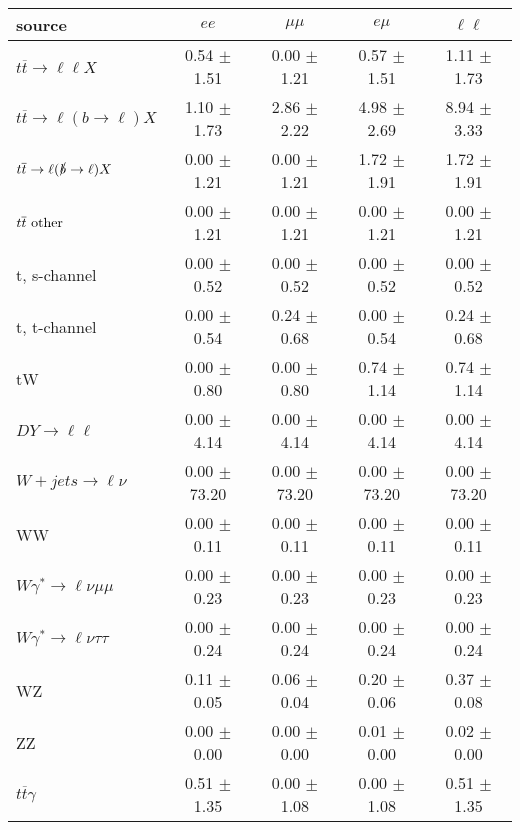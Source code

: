 \begin{tabular}{l|cccc} \hline\hline
source & $ee$ & $\mu\mu$ & $e\mu$ & $\ell\ell $ \\
\hline
$t\overline{t} \rightarrow \ell \ell X$ &  0.54 $\pm$  1.51 &  0.00 $\pm$  1.21 &  0.57 $\pm$  1.51 &  1.11 $\pm$  1.73 \\
$t\overline{t} \rightarrow \ell (b \rightarrow \ell) X$ &  1.10 $\pm$  1.73 &  2.86 $\pm$  2.22 &  4.98 $\pm$  2.69 &  8.94 $\pm$  3.33 \\
$t\overline{t} \rightarrow \ell (\slashed b \rightarrow \ell) X$ &  0.00 $\pm$  1.21 &  0.00 $\pm$  1.21 &  1.72 $\pm$  1.91 &  1.72 $\pm$  1.91 \\
        $t\overline{t}\ \rm{other}$ &  0.00 $\pm$  1.21 &  0.00 $\pm$  1.21 &  0.00 $\pm$  1.21 &  0.00 $\pm$  1.21 \\
\hline
                       t, s-channel &  0.00 $\pm$  0.52 &  0.00 $\pm$  0.52 &  0.00 $\pm$  0.52 &  0.00 $\pm$  0.52 \\
                       t, t-channel &  0.00 $\pm$  0.54 &  0.24 $\pm$  0.68 &  0.00 $\pm$  0.54 &  0.24 $\pm$  0.68 \\
                                 tW &  0.00 $\pm$  0.80 &  0.00 $\pm$  0.80 &  0.74 $\pm$  1.14 &  0.74 $\pm$  1.14 \\
\hline
         $DY \rightarrow \ell \ell$ &  0.00 $\pm$  4.14 &  0.00 $\pm$  4.14 &  0.00 $\pm$  4.14 &  0.00 $\pm$  4.14 \\
      $W+jets \rightarrow \ell \nu$ &  0.00 $\pm$ 73.20 &  0.00 $\pm$ 73.20 &  0.00 $\pm$ 73.20 &  0.00 $\pm$ 73.20 \\
                                 WW &  0.00 $\pm$  0.11 &  0.00 $\pm$  0.11 &  0.00 $\pm$  0.11 &  0.00 $\pm$  0.11 \\
\hline
$W\gamma^{*} \rightarrow \ell \nu \mu\mu$ &  0.00 $\pm$  0.23 &  0.00 $\pm$  0.23 &  0.00 $\pm$  0.23 &  0.00 $\pm$  0.23 \\
$W\gamma^{*} \rightarrow \ell \nu \tau\tau$ &  0.00 $\pm$  0.24 &  0.00 $\pm$  0.24 &  0.00 $\pm$  0.24 &  0.00 $\pm$  0.24 \\
                                 WZ &  0.11 $\pm$  0.05 &  0.06 $\pm$  0.04 &  0.20 $\pm$  0.06 &  0.37 $\pm$  0.08 \\
                                 ZZ &  0.00 $\pm$  0.00 &  0.00 $\pm$  0.00 &  0.01 $\pm$  0.00 &  0.02 $\pm$  0.00 \\
\hline
              $t\overline{t}\gamma$ &  0.51 $\pm$  1.35 &  0.00 $\pm$  1.08 &  0.00 $\pm$  1.08 &  0.51 $\pm$  1.35 \\

\end{tabular}
